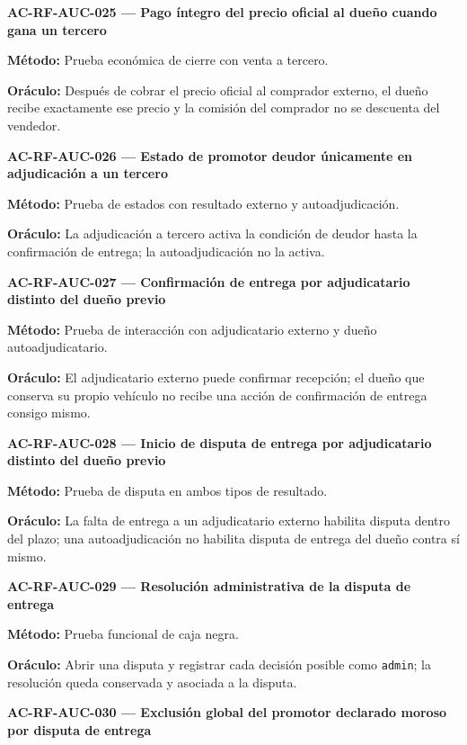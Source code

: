 \documentclass[10pt,letterpaper]{article}
\begin{document}
\noindent\textbf{AC-RF-AUC-025 --- Pago íntegro del precio oficial al dueño cuando gana un tercero}\par
\textbf{Método:} Prueba económica de cierre con venta a tercero.\par
\textbf{Oráculo:} Después de cobrar el precio oficial al comprador externo, el dueño recibe exactamente ese precio y la comisión del comprador no se descuenta del vendedor.\par\vspace{0.45em}
\noindent\textbf{AC-RF-AUC-026 --- Estado de promotor deudor únicamente en adjudicación a un tercero}\par
\textbf{Método:} Prueba de estados con resultado externo y autoadjudicación.\par
\textbf{Oráculo:} La adjudicación a tercero activa la condición de deudor hasta la confirmación de entrega; la autoadjudicación no la activa.\par\vspace{0.45em}
\noindent\textbf{AC-RF-AUC-027 --- Confirmación de entrega por adjudicatario distinto del dueño previo}\par
\textbf{Método:} Prueba de interacción con adjudicatario externo y dueño autoadjudicatario.\par
\textbf{Oráculo:} El adjudicatario externo puede confirmar recepción; el dueño que conserva su propio vehículo no recibe una acción de confirmación de entrega consigo mismo.\par\vspace{0.45em}
\noindent\textbf{AC-RF-AUC-028 --- Inicio de disputa de entrega por adjudicatario distinto del dueño previo}\par
\textbf{Método:} Prueba de disputa en ambos tipos de resultado.\par
\textbf{Oráculo:} La falta de entrega a un adjudicatario externo habilita disputa dentro del plazo; una autoadjudicación no habilita disputa de entrega del dueño contra sí mismo.\par\vspace{0.45em}
\noindent\textbf{AC-RF-AUC-029 --- Resolución administrativa de la disputa de entrega}\par
\textbf{Método:} Prueba funcional de caja negra.\par
\textbf{Oráculo:} Abrir una disputa y registrar cada decisión posible como \texttt{admin}; la resolución queda conservada y asociada a la disputa.\par\vspace{0.45em}
\noindent\textbf{AC-RF-AUC-030 --- Exclusión global del promotor declarado moroso por disputa de entrega}\par
\end{document}
